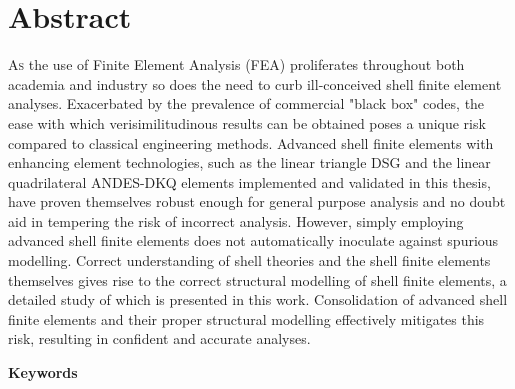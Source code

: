
\chapter*{Abstract}
\label{cha:abstract}
\lettrine[lines=2]{A}{s} the use of Finite Element Analysis (FEA) proliferates throughout both academia and industry so does the need to curb ill-conceived shell finite element analyses. Exacerbated by the prevalence of commercial "black box" codes, the ease with which verisimilitudinous results can be obtained poses a unique risk compared to classical engineering methods. Advanced shell finite elements with enhancing element technologies, such as the linear triangle DSG and the linear quadrilateral ANDES-DKQ elements implemented and validated in this thesis, have proven themselves robust enough for general purpose analysis and no doubt aid in tempering the risk of incorrect analysis. However, simply employing advanced shell finite elements does not automatically inoculate against spurious modelling. Correct understanding of shell theories and the shell finite elements themselves gives rise to the correct structural modelling of shell finite elements, a detailed study of which is presented in this work. Consolidation of advanced shell finite elements and their proper structural modelling effectively mitigates this risk, resulting in confident and accurate analyses.

\vspace*{10mm}

{\textcolor{gray75}{\Huge\bfseries{Keywords}}}

\vspace*{8mm}

\keywords

\newpage